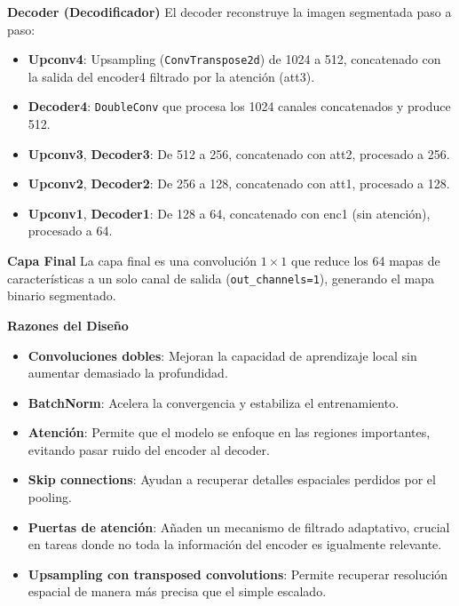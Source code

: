 \begin{enumerate}
\begin{itemize}
\textbf{Decoder (Decodificador)}
El decoder reconstruye la imagen segmentada paso a paso:
\begin{itemize}
    \item \textbf{Upconv4}: Upsampling (\texttt{ConvTranspose2d}) de 1024 a 512, concatenado con la salida del encoder4 filtrado por la atención (att3).
    \item \textbf{Decoder4}: \texttt{DoubleConv} que procesa los 1024 canales concatenados y produce 512.
    \item \textbf{Upconv3}, \textbf{Decoder3}: De 512 a 256, concatenado con att2, procesado a 256.
    \item \textbf{Upconv2}, \textbf{Decoder2}: De 256 a 128, concatenado con att1, procesado a 128.
    \item \textbf{Upconv1}, \textbf{Decoder1}: De 128 a 64, concatenado con enc1 (sin atención), procesado a 64.
\end{itemize}

\textbf{Capa Final}
La capa final es una convolución $1\times1$ que reduce los 64 mapas de características a un solo canal de salida (\texttt{out\_channels=1}), generando el mapa binario segmentado.

\textbf{Razones del Diseño}
\begin{itemize}
    \item \textbf{Convoluciones dobles}: Mejoran la capacidad de aprendizaje local sin aumentar demasiado la profundidad.
    \item \textbf{BatchNorm}: Acelera la convergencia y estabiliza el entrenamiento.
    \item \textbf{Atención}: Permite que el modelo se enfoque en las regiones importantes, evitando pasar ruido del encoder al decoder.
    \item \textbf{Skip connections}: Ayudan a recuperar detalles espaciales perdidos por el pooling.
    \item \textbf{Puertas de atención}: Añaden un mecanismo de filtrado adaptativo, crucial en tareas donde no toda la información del encoder es igualmente relevante.
    \item \textbf{Upsampling con transposed convolutions}: Permite recuperar resolución espacial de manera más precisa que el simple escalado.
\end{itemize}


\end{itemize}
\end{enumerate}
